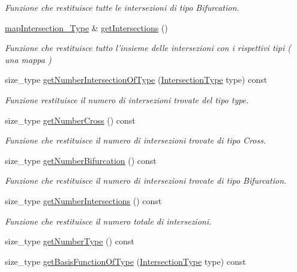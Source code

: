 \begin{DoxyCompactItemize}
\begin{DoxyCompactList}\small\item\em Funzione che restituisce tutte le intersezioni di tipo Bifurcation. \end{DoxyCompactList}\item 
\hyperlink{classFractureIntersect_a4eea7d0aca48cdd36ea1756e75280332}{map\-Intersection\-\_\-\-Type} \& \hyperlink{classFractureIntersect_a1b785b0ed94d3a403b9f0e21f092b4ab}{get\-Intersections} ()
\begin{DoxyCompactList}\small\item\em Funzione che restituisce tutto l'insieme delle intersezioni con i rispettivi tipi ( una mappa ) \end{DoxyCompactList}\item 
size\-\_\-type \hyperlink{classFractureIntersect_a1cd070dda9460d884c1b1d92edfecc12}{get\-Number\-Intersection\-Of\-Type} (\hyperlink{classFractureIntersect_a9a4e4a784fa4c8e359767ed543f89dc5}{Intersection\-Type} type) const 
\begin{DoxyCompactList}\small\item\em Funzione restituisce il numero di intersezioni trovate del tipo type. \end{DoxyCompactList}\item 
size\-\_\-type \hyperlink{classFractureIntersect_a8d9f707319b9b83744b6e03f19003734}{get\-Number\-Cross} () const 
\begin{DoxyCompactList}\small\item\em Funzione che restituisce il numero di intersezioni trovate di tipo Cross. \end{DoxyCompactList}\item 
size\-\_\-type \hyperlink{classFractureIntersect_afba7c92096a4b92a27fcb4f1158c7279}{get\-Number\-Bifurcation} () const 
\begin{DoxyCompactList}\small\item\em Funzione che restituisce il numero di intersezioni trovate di tipo Bifurcation. \end{DoxyCompactList}\item 
size\-\_\-type \hyperlink{classFractureIntersect_aaff97a1338251e796ce44db631961459}{get\-Number\-Intersections} () const 
\begin{DoxyCompactList}\small\item\em Funzione che restituisce il numero totale di intersezioni. \end{DoxyCompactList}\item 
size\-\_\-type \hyperlink{classFractureIntersect_a86195f7e54a79412d2d54fa5efad9af2}{get\-Number\-Type} () const 
\item 
size\-\_\-type \hyperlink{classFractureIntersect_a8293ef859c572a375c7c5f6e79399b1e}{get\-Basis\-Function\-Of\-Type} (\hyperlink{classFractureIntersect_a9a4e4a784fa4c8e359767ed543f89dc5}{Intersection\-Type} type) const 
\end{DoxyCompactItemize}


